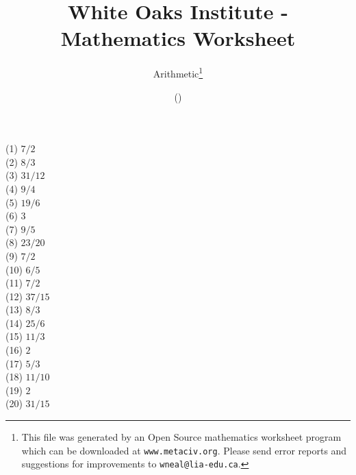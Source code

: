 \documentclass[letter]{article}
\begin{document}
\title{White Oaks Institute - Mathematics Worksheet}
\author{Arithmetic\thanks{This file was generated by an \textsf{Open Source} mathematics worksheet program which can be downloaded at \texttt{www.metaciv.org}. Please send error reports and suggestions for improvements to \texttt{wneal@lia-edu.ca}.}}
\date{\XCfileversion{} (\XCfiledate)}
\maketitle
\begin{multicols}{2}(1) $7/2$\\(2) $8/3$\\(3) $31/12$\\(4) $9/4$\\(5) $19/6$\\(6) $3$\\(7) $9/5$\\(8) $23/20$\\(9) $7/2$\\(10) $6/5$\\(11) $7/2$\\(12) $37/15$\\(13) $8/3$\\(14) $25/6$\\(15) $11/3$\\(16) $2$\\(17) $5/3$\\(18) $11/10$\\(19) $2$\\(20) $31/15$\end{multicols}
\end{document}
